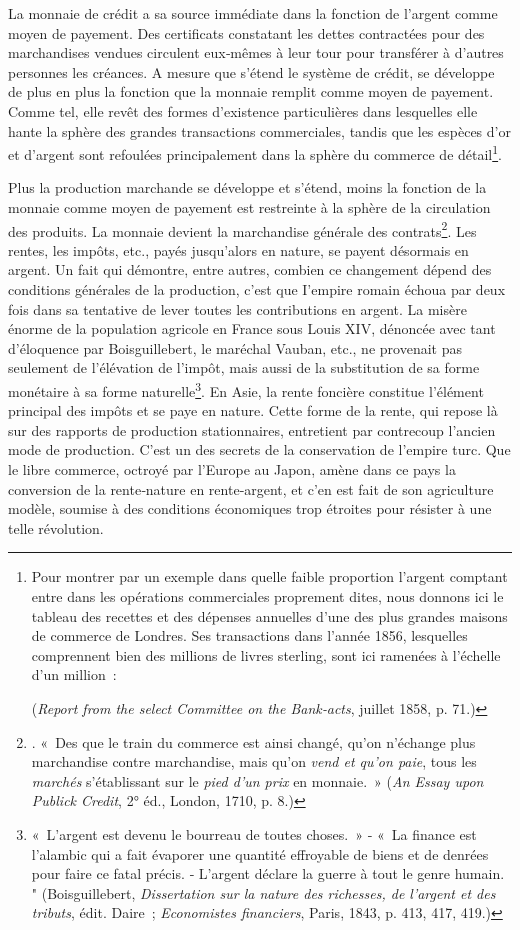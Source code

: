 \documentclass[french,twoside]{book} %
\begin{document}
La monnaie de crédit a sa source immédiate dans la fonction de l’argent comme moyen de payement. Des certificats constatant les dettes contractées pour des marchandises vendues circulent eux‑mêmes à leur tour pour transférer à d’autres personnes les créances. A mesure que s’étend le système de crédit, se développe de plus en plus la fonction que la monnaie remplit comme moyen de payement. Comme tel, elle revêt des formes d’existence particulières dans lesquelles elle hante la sphère des grandes transactions commerciales, tandis que les espèces d’or et d’argent sont refoulées principalement dans la sphère du commerce de détail\footnote{ \noindent Pour montrer par un exemple dans quelle faible proportion l’argent comptant entre dans les opérations commerciales proprement dites, nous donnons ici le tableau des recettes et des dépenses annuelles d’une des plus grandes maisons de commerce de Londres. Ses transactions dans l’année 1856, lesquelles comprennent bien des millions de livres sterling, sont ici ramenées à l’échelle d’un million :\par
 (\emph{Report from the select Committee on the Bank‑acts}, juillet 1858, p. 71.)
}.\par
Plus la production marchande se développe et s’étend, moins la fonction de la monnaie comme moyen de payement est restreinte à la sphère de la circulation des produits. La monnaie devient la marchandise générale des contrats\footnote{. « Des que le train du commerce est ainsi changé, qu’on n’échange plus marchandise contre marchandise, mais qu’on \emph{vend et qu’on paie}, tous les \emph{marchés} s’établissant sur le \emph{pied d’un prix} en monnaie. » (\emph{An Essay upon Publick Credit}, 2° éd., London, 1710, p. 8.)}. Les rentes, les impôts, etc., payés jusqu’alors en nature, se payent désormais en argent. Un fait qui démontre, entre autres, combien ce changement dépend des conditions générales de la production, c’est que I’empire romain échoua par deux fois dans sa tentative de lever toutes les contributions en argent. La misère énorme de la population agricole en France sous Louis XIV, dénoncée avec tant d’éloquence par Boisguillebert, le maréchal Vauban, etc., ne provenait pas seulement de l’élévation de l’impôt, mais aussi de la substitution de sa forme monétaire à sa forme naturelle\footnote{« L’argent est devenu le bourreau de toutes choses. » ‑ « La finance est l’alambic qui a fait évaporer une quantité effroyable de biens et de denrées pour faire ce fatal précis. ‑ L’argent déclare la guerre à tout le genre humain. " (Boisguillebert, \emph{Dissertation sur la nature des richesses, de l’argent et des tributs}, édit. Daire ; \emph{Economistes financiers}, Paris, 1843, p. 413, 417, 419.)}. En Asie, la rente foncière constitue l’élément principal des impôts et se paye en nature. Cette forme de la rente, qui repose là sur des rapports de production stationnaires, entretient par contrecoup l’ancien mode de production. C’est un des secrets de la conservation de l’empire turc. Que le libre commerce, octroyé par l’Europe au Japon, amène dans ce pays la conversion de la rente‑nature en rente‑argent, et c’en est fait de son agriculture modèle, soumise à des conditions économiques trop étroites pour résister à une telle révolution.\par
\end{document}
